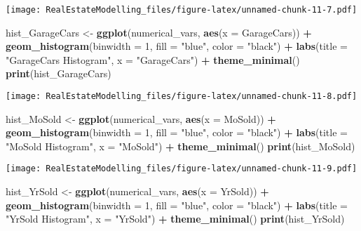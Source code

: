 \documentclass[
]{article}
\newenvironment{Shaded}{\begin{snugshade}}{\end{snugshade}}
\newcommand{\AttributeTok}[1]{\textcolor[rgb]{0.13,0.29,0.53}{#1}}
\newcommand{\DecValTok}[1]{\textcolor[rgb]{0.00,0.00,0.81}{#1}}
\newcommand{\FunctionTok}[1]{\textcolor[rgb]{0.13,0.29,0.53}{\textbf{#1}}}
\newcommand{\NormalTok}[1]{#1}
\newcommand{\OtherTok}[1]{\textcolor[rgb]{0.56,0.35,0.01}{#1}}
\newcommand{\SpecialCharTok}[1]{\textcolor[rgb]{0.81,0.36,0.00}{\textbf{#1}}}
\newcommand{\StringTok}[1]{\textcolor[rgb]{0.31,0.60,0.02}{#1}}
\begin{document}
\texttt{[image: RealEstateModelling\_files/figure-latex/unnamed-chunk-11-7.pdf]}

\begin{Shaded}
\begin{Highlighting}[]
\NormalTok{hist\_GarageCars }\OtherTok{\textless{}{-}} \FunctionTok{ggplot}\NormalTok{(numerical\_vars, }\FunctionTok{aes}\NormalTok{(}\AttributeTok{x =}\NormalTok{ GarageCars)) }\SpecialCharTok{+}
  \FunctionTok{geom\_histogram}\NormalTok{(}\AttributeTok{binwidth =} \DecValTok{1}\NormalTok{, }\AttributeTok{fill =} \StringTok{"blue"}\NormalTok{, }\AttributeTok{color =} \StringTok{"black"}\NormalTok{) }\SpecialCharTok{+}
  \FunctionTok{labs}\NormalTok{(}\AttributeTok{title =} \StringTok{"GarageCars Histogram"}\NormalTok{, }\AttributeTok{x =} \StringTok{"GarageCars"}\NormalTok{) }\SpecialCharTok{+}
  \FunctionTok{theme\_minimal}\NormalTok{()}
\FunctionTok{print}\NormalTok{(hist\_GarageCars)}
\end{Highlighting}
\end{Shaded}

\texttt{[image: RealEstateModelling\_files/figure-latex/unnamed-chunk-11-8.pdf]}

\begin{Shaded}
\begin{Highlighting}[]
\NormalTok{hist\_MoSold }\OtherTok{\textless{}{-}} \FunctionTok{ggplot}\NormalTok{(numerical\_vars, }\FunctionTok{aes}\NormalTok{(}\AttributeTok{x =}\NormalTok{ MoSold)) }\SpecialCharTok{+}
  \FunctionTok{geom\_histogram}\NormalTok{(}\AttributeTok{binwidth =} \DecValTok{1}\NormalTok{, }\AttributeTok{fill =} \StringTok{"blue"}\NormalTok{, }\AttributeTok{color =} \StringTok{"black"}\NormalTok{) }\SpecialCharTok{+}
  \FunctionTok{labs}\NormalTok{(}\AttributeTok{title =} \StringTok{"MoSold Histogram"}\NormalTok{, }\AttributeTok{x =} \StringTok{"MoSold"}\NormalTok{) }\SpecialCharTok{+}
  \FunctionTok{theme\_minimal}\NormalTok{()}
\FunctionTok{print}\NormalTok{(hist\_MoSold)}
\end{Highlighting}
\end{Shaded}

\texttt{[image: RealEstateModelling\_files/figure-latex/unnamed-chunk-11-9.pdf]}

\begin{Shaded}
\begin{Highlighting}[]
\NormalTok{hist\_YrSold }\OtherTok{\textless{}{-}} \FunctionTok{ggplot}\NormalTok{(numerical\_vars, }\FunctionTok{aes}\NormalTok{(}\AttributeTok{x =}\NormalTok{ YrSold)) }\SpecialCharTok{+}
  \FunctionTok{geom\_histogram}\NormalTok{(}\AttributeTok{binwidth =} \DecValTok{1}\NormalTok{, }\AttributeTok{fill =} \StringTok{"blue"}\NormalTok{, }\AttributeTok{color =} \StringTok{"black"}\NormalTok{) }\SpecialCharTok{+}
  \FunctionTok{labs}\NormalTok{(}\AttributeTok{title =} \StringTok{"YrSold Histogram"}\NormalTok{, }\AttributeTok{x =} \StringTok{"YrSold"}\NormalTok{) }\SpecialCharTok{+}
  \FunctionTok{theme\_minimal}\NormalTok{()}
\FunctionTok{print}\NormalTok{(hist\_YrSold)}
\end{Highlighting}
\end{Shaded}
\end{document}
